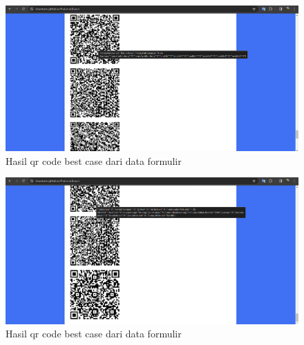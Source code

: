 \begin{figure}[H]
	\centering
	\includegraphics[scale=0.4]{Gambar/best2.png}
	\caption{Hasil qr code best case dari data formulir} 
	\label{fig:qrCodeBestCase2}
\end{figure}

\begin{figure}[H]
	\centering
	\includegraphics[scale=0.4]{Gambar/best3.png}
	\caption{Hasil qr code best case dari data formulir} 
	\label{fig:qrCodeBestCase3}
\end{figure}

